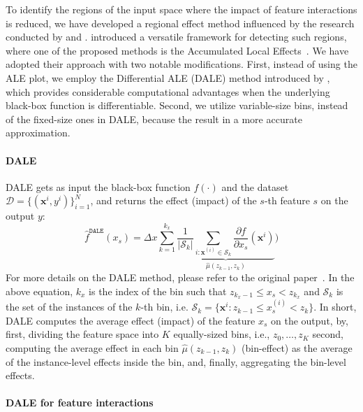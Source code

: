 \documentclass[runningheads]{llncs}
\newcommand{\dfdx}{\frac{\partial f}{\partial x_s}}
\newcommand{\xb}{\mathbf{x}}
\begin{document}
To identify the regions of the input space where the impact of feature interactions is reduced,
we have developed a regional effect method influenced by the research conducted by
\citet{herbinger2023decomposing} and \citet{gkolemis2023dale}.
\citet{herbinger2023decomposing} introduced a versatile framework for detecting such regions,
where one of the proposed methods is the Accumulated Local Effects~\citep{apley2020visualizing}.
We have adopted their approach with two notable modifications.
First, instead of using the ALE plot, we employ the Differential ALE (DALE) method introduced by \citet{gkolemis2023dale},
which provides considerable computational advantages when the underlying black-box function is differentiable.
Second, we utilize variable-size bins, instead of the fixed-size ones in DALE, because the result in a more accurate approximation.

\paragraph{DALE}

DALE gets as input the black-box function \(f(\cdot)\)
and the dataset \(\mathcal{D} = \{(\xb^i, y^i)\}_{i=1}^N\),
and returns the effect (impact) of the $s$-th feature $s$ on the output $y$:
%
\begin{equation}  \label{eq:DALE_accumulated_mean_est}
  \hat{f}^{\mathtt{DALE}}(x_s) = \Delta x \sum_{k=1}^{k_x} \underbrace{\frac{1}{|\mathcal{S}_k|} \sum_{i:\mathbf{x}^{(i)} \in
    \mathcal{S}_k} \dfdx(\mathbf{x}^i)}_{\hat{\mu}(z_{k-1}, z_k)})
\end{equation}
%
For more details on the DALE method, please refer to the original paper~\citep{gkolemis2023dale}.
In the above equation, \(k_x\) is the index of the bin such that
\(z_{k_x-1} \leq x_s < z_{k_x} \) and \(\mathcal{S}_k\)
is the set of the instances of the \(k\)-th bin, i.e.
\( \mathcal{S}_k = \{ \xb^i : z_{k-1} \leq x^{(i)}_s < z_{k} \} \).
In short, DALE computes the average effect (impact) of the feature \(x_s\) on the output,
by, first, dividing the feature space into $K$ equally-sized bins, i.e., \(z_0, \ldots, z_K\)
second, computing the average effect in each bin \(\hat{\mu}(z_{k-1}, z_k)\) (bin-effect) as the average of the instance-level effects inside the bin,
and, finally, aggregating the bin-level effects.

\paragraph{DALE for feature interactions}
\end{document}
